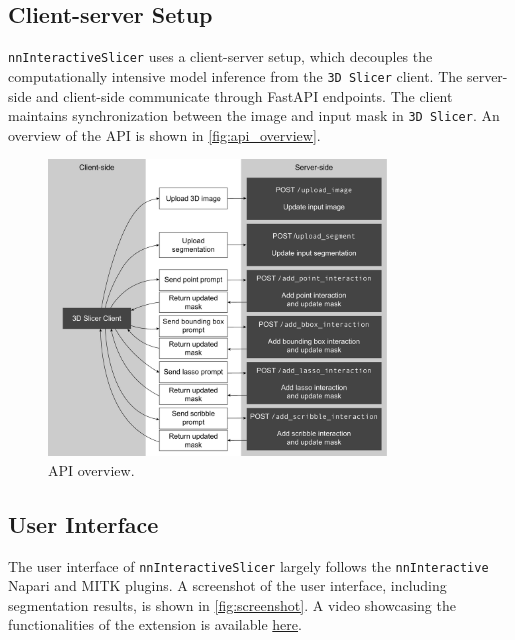 \documentclass[
]{article}
\begin{document}
\subsection{Client-server Setup}\label{client-server-setup}

\texttt{nnInteractiveSlicer} uses a client-server setup, which decouples
the computationally intensive model inference from the
\texttt{3D\ Slicer} client. The server-side and client-side communicate
through FastAPI endpoints. The client maintains synchronization between
the image and input mask in \texttt{3D\ Slicer}. An overview of the API
is shown in \autoref{fig:api_overview}.

\begin{figure}
\centering
\includegraphics[width=0.8\textwidth,height=\textheight]{img/nni_api.pdf}
\caption{API overview.\label{fig:api_overview}}
\end{figure}

\subsection{User Interface}\label{user-interface}

The user interface of \texttt{nnInteractiveSlicer} largely follows the
\texttt{nnInteractive} Napari and MITK plugins. A screenshot of the user
interface, including segmentation results, is shown in
\autoref{fig:screenshot}. A video showcasing the functionalities of the
extension is available
\href{https://www.youtube.com/watch?v=mW_fUT1-IWM}{here}.
\end{document}
